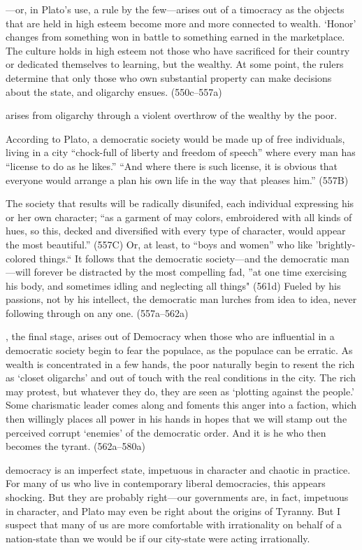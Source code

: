 ---or, in Plato's use, a rule by the few---arises out of a timocracy as the objects that are held in high esteem become more and more connected to wealth. `Honor' changes from something won in battle to something earned in the marketplace. The culture holds in high esteem not those who have sacrificed for their country or dedicated themselves to learning, but the wealthy. At some point, the rulers determine that only those who own substantial property can make decisions about the state, and oligarchy ensues. (550c--557a)

 arises from oligarchy through a violent overthrow of the wealthy by the poor. 

According to Plato, a democratic society would be made up of free individuals, living in a city ``chock-full of liberty and freedom of speech'' where every man has ``license to do as he likes.'' ``And where there is such license, it is obvious that everyone would arrange a plan his own life in the way that pleases him.'' (557B) 

The society that results will be radically disunifed, each individual expressing his or her own character; ``as a garment of may colors, embroidered with all kinds of hues, so this, decked and diversified with every type of character, would appear the most beautiful.'' (557C) Or, at least, to ``boys and women'' who like 'brightly-colored things.`` It follows that the democratic society---and the democratic man---will forever be distracted by the most compelling fad, ''at one time exercising his body, and sometimes idling and neglecting all things" (561d) Fueled by his passions, not by his intellect, the democratic man lurches from idea to idea, never following through on any one. (557a--562a)

, the final stage, arises out of Democracy when those who are influential in a democratic society begin to fear the populace, as the populace can be erratic. As wealth is concentrated in a few hands, the poor naturally begin to resent the rich as `closet oligarchs' and out of touch with the real conditions in the city. The rich may protest, but whatever they do, they are seen as `plotting against the people.' Some charismatic leader comes along and foments this anger into a faction, which then willingly places all power in his hands in hopes that we will stamp out the perceived corrupt `enemies' of the democratic order. And it is he who then becomes the tyrant. (562a--580a)

 democracy is an imperfect state, impetuous in character and chaotic in practice. For many of us who live in contemporary liberal democracies, this appears shocking. But they are probably right---our governments are, in fact, impetuous in character, and Plato may even be right about the origins of Tyranny. But I suspect that many of us are more comfortable with irrationality on behalf of a nation-state than we would be if our city-state were acting irrationally. 

